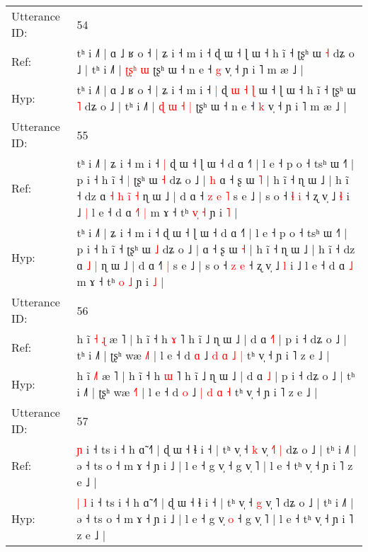 \documentclass[10pt]{article}
\DeclareRobustCommand{\hl}[1]{{\textcolor{red}{#1}}}
\begin{document}
\begin{longtable}{ll}
\midrule
Utterance ID: & 54 \\
Ref: & tʰ i ˩˥ | ɑ ˩ ʁ o ˧ | ʑ i ˧ m i ˧\hl{}\hl{} ɖ\hl{}\hl{}\hl{}\hl{}\hl{}\hl{} ɯ ˧ ɭ ɯ ˧ h ĩ ˧ ʈʂʰ ɯ \hl{˧} dʑ o ˩ | tʰ i ˩˥ |\hl{}\hl{} \hl{ʈ}\hl{ʂ}\hl{ʰ} \hl{ɯ} ʈʂʰ ɯ ˧ n e ˧ \hl{g} v̩ ˧ ɲ i ˥ m æ ˩ |
 \\
Hyp: & tʰ i ˩˥ | ɑ ˩ ʁ o ˧ | ʑ i ˧ m i ˧\hl{ }\hl{|} ɖ\hl{ }\hl{ɯ}\hl{ }\hl{˧}\hl{ }\hl{ɭ} ɯ ˧ ɭ ɯ ˧ h ĩ ˧ ʈʂʰ ɯ \hl{˥} dʑ o ˩ | tʰ i ˩˥ |\hl{ }\hl{ɖ} \hl{ɯ}\hl{ }\hl{˧} \hl{|} ʈʂʰ ɯ ˧ n e ˧ \hl{k} v̩ ˧ ɲ i ˥ m æ ˩ |
 \\
\midrule
Utterance ID: & 55 \\
Ref: & tʰ i ˩˥ | ʑ i ˧ m i ˧\hl{ }\hl{|} ɖ ɯ ˧ ɭ ɯ ˧ d ɑ ˧˥ | l e ˧ p o ˧ tsʰ ɯ ˧˥ | p i ˧ h ĩ ˧\hl{ }\hl{|} ʈʂʰ ɯ \hl{˧} dʑ o ˩ |\hl{ }\hl{h} ɑ ˧ ʂ ɯ \hl{˥} | h ĩ ˧ ɳ ɯ ˩ | h ĩ ˧ dz ɑ\hl{ }\hl{˧}\hl{ }\hl{h} \hl{i}\hl{̃} \hl{˧} ɳ ɯ ˩ | d ɑ ˧\hl{ }\hl{z}\hl{ }\hl{e} \hl{˥} s e ˩ | s o ˧ \hl{ɬ} \hl{i} ˧ ʐ v̩ ˩ \hl{ɬ} i ˩\hl{ }\hl{|} l e ˧ d ɑ\hl{ }\hl{˧}\hl{˥} \hl{|} m ɤ ˧ tʰ \hl{v}\hl{̩} \hl{˧} ɲ i \hl{˥} |
 \\
Hyp: & tʰ i ˩˥ | ʑ i ˧ m i ˧\hl{}\hl{} ɖ ɯ ˧ ɭ ɯ ˧ d ɑ ˧˥ | l e ˧ p o ˧ tsʰ ɯ ˧˥ | p i ˧ h ĩ ˧\hl{}\hl{} ʈʂʰ ɯ \hl{˩} dʑ o ˩ |\hl{}\hl{} ɑ ˧ ʂ ɯ \hl{˧} | h ĩ ˧ ɳ ɯ ˩ | h ĩ ˧ dz ɑ\hl{}\hl{}\hl{}\hl{} \hl{}\hl{˩} \hl{|} ɳ ɯ ˩ | d ɑ ˧\hl{}\hl{}\hl{}\hl{˥} \hl{|} s e ˩ | s o ˧ \hl{z} \hl{e} ˧ ʐ v̩ ˩ \hl{l} i ˩\hl{}\hl{} l e ˧ d ɑ\hl{}\hl{}\hl{} \hl{˩} m ɤ ˧ tʰ \hl{}\hl{o} \hl{˩} ɲ i \hl{˩} |
 \\
\midrule
Utterance ID: & 56 \\
Ref: & h ĩ \hl{˧}\hl{ }\hl{ɻ} æ ˥ | h ĩ ˧ h \hl{ɤ} ˥ h ĩ ˩ ɳ ɯ ˩ | d ɑ \hl{˧}\hl{˥} | p i ˧ dʑ o ˩ | tʰ i ˩˥ | ʈʂʰ wæ \hl{˩}˥ | l e ˧ d \hl{ɑ} ˩ \hl{d} \hl{ɑ} \hl{˩} \hl{|} tʰ v̩ ˧ ɲ i ˥ z e ˩ |
 \\
Hyp: & h ĩ \hl{}\hl{˩}\hl{˥} æ ˥ | h ĩ ˧ h \hl{ɯ} ˥ h ĩ ˩ ɳ ɯ ˩ | d ɑ \hl{}\hl{˩} | p i ˧ dʑ o ˩ | tʰ i ˩˥ | ʈʂʰ wæ \hl{˧}˥ | l e ˧ d \hl{o} ˩ \hl{|} \hl{d} \hl{ɑ} \hl{˧} tʰ v̩ ˧ ɲ i ˥ z e ˩ |
 \\
\midrule
Utterance ID: & 57 \\
Ref: & \hl{}\hl{}\hl{ɲ} i ˧ ts i ˧ h ɑ̃ ˧˥ | ɖ ɯ ˧ ɬ i ˧ | tʰ v̩ ˧ \hl{k} v̩ \hl{˧}˥\hl{ }\hl{|} dʑ o ˩ | tʰ i ˩˥ | ə ˧ ts o ˧ m ɤ ˧ ɲ i ˩ | l e ˧ g v̩\hl{}\hl{} ˧ g v̩ ˥ | l e ˧ tʰ v̩ ˧ ɲ i ˥ z e ˩ |
 \\
Hyp: & \hl{|}\hl{ }\hl{l} i ˧ ts i ˧ h ɑ̃ ˧˥ | ɖ ɯ ˧ ɬ i ˧ | tʰ v̩ ˧ \hl{g} v̩ \hl{}˥\hl{}\hl{} dʑ o ˩ | tʰ i ˩˥ | ə ˧ ts o ˧ m ɤ ˧ ɲ i ˩ | l e ˧ g v̩\hl{ }\hl{o} ˧ g v̩ ˥ | l e ˧ tʰ v̩ ˧ ɲ i ˥ z e ˩ |

\end{longtable}
\end{document}
